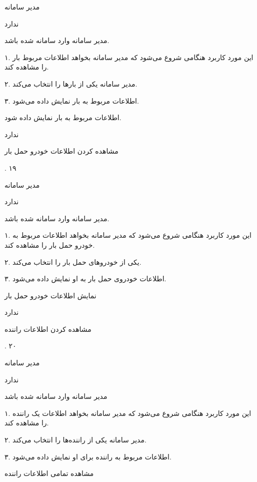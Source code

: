 مدیر سامانه

ندارد

مدیر سامانه وارد سامانه شده باشد.


۱. این مورد کاربرد هنگامی شروع می‌شود که مدیر سامانه بخواهد اطلاعات مربوط بار را مشاهده کند.

۲. مدیر سامانه یکی از بارها را انتخاب می‌کند.

۳. اطلاعات مربوط به بار نمایش داده می‌شود.

اطلاعات مربوط به بار نمایش داده شود.

ندارد

\noindent \hrulefill

مشاهده کردن اطلاعات خودرو حمل بار

.
۱۹

مدیر سامانه

ندارد

مدیر سامانه وارد سامانه شده باشد.


۱. این مورد کاربرد هنگامی شروع می‌شود که مدیر سامانه بخواهد اطلاعات مربوط به خودرو حمل بار را مشاهده کند.

۲. یکی از خودروهای حمل بار را انتخاب می‌کند.

۳. اطلاعات خودروی حمل بار به او نمایش داده می‌شود.

نمایش اطلاعات خودرو حمل بار

ندارد

\noindent \hrulefill



مشاهده کردن اطلاعات راننده

.
۲۰

مدیر سامانه

ندارد

مدیر سامانه وارد سامانه شده باشد


۱. این مورد کاربرد هنگامی شروع می‌شود که مدیر سامانه بخواهد اطلاعات یک راننده را مشاهده کند.

۲. مدیر سامانه یکی از راننده‌ها را انتخاب می‌کند.

۳. اطلاعات مربوط به راننده برای او نمایش داده می‌شود.

مشاهده تمامی اطلاعات راننده

